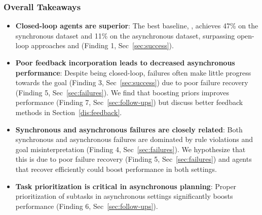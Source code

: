 
\subsubsection{Overall Takeaways}
\begin{itemize}[leftmargin=*]
    \item \textbf{Closed-loop agents are superior}: The best baseline, \gptfo{} \react{}, achieves 47\% on the synchronous dataset and 11\% on the asynchronous dataset, surpassing open-loop approaches \io{} and \iocot{} (Finding 1, Sec~\ref{sec:success}).
    \item \textbf{Poor feedback incorporation leads to decreased asynchronous performance}: Despite being closed-loop, \gptfo{} \react{} failures often make little progress towards the goal (Finding 3, Sec~\ref{sec:success}) due to poor failure recovery (Finding 5, Sec~\ref{sec:failures}). We find that boosting priors improves performance (Finding 7, Sec~\ref{sec:follow-ups}) but discuss better feedback methods in Section~\ref{dis:feedback}.
    \item \textbf{Synchronous and asynchronous failures are closely related}: Both synchronous and asynchronous failures are dominated by rule violations and goal misinterpretation (Finding 4, Sec~\ref{sec:failures}). We hypothesize that this is due to poor failure recovery (Finding 5, Sec~\ref{sec:failures}) and agents that recover efficiently could boost performance in both settings.
    \item \textbf{Task prioritization is critical in asynchronous planning}: Proper prioritization of subtasks in asynchronous settings significantly boosts performance (Finding 6, Sec~\ref{sec:follow-ups}).
\end{itemize}

